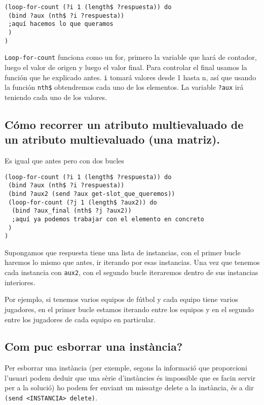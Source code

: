 \documentclass[11pt,svgnames]{scrbook}
\begin{document}
\begin{verbatim}
(loop-for-count (?i 1 (length$ ?respuesta)) do  
 (bind ?aux (nth$ ?i ?respuesta)) 
 ;aquí hacemos lo que queramos 
 ) 
) \end{verbatim} 
 
\texttt{Loop-for-count} funciona como un for, primero la variable que hará
de contador, luego el valor de origen y luego el valor final. Para controlar el
final usamos la función que he explicado antes.
\texttt{i} tomará valores desde 1 hasta n, así que usando la función
\texttt{nth\$} obtendremos cada uno de los elementos. La variable \texttt{?aux} irá
teniendo cada uno de los valores.

\subsection{Cómo recorrer un atributo multievaluado de un atributo multievaluado
(una
matriz).}

Es igual que antes pero con dos bucles


\begin{verbatim}
(loop-for-count (?i 1 (length$ ?respuesta)) do 
 (bind ?aux (nth$ ?i ?respuesta)) 
 (bind ?aux2 (send ?aux get-slot_que_queremos)) 
 (loop-for-count (?j 1 (length$ ?aux2)) do 
  (bind ?aux_final (nth$ ?j ?aux2)) 
  ;aquí ya podemos trabajar con el elemento en concreto
 ) 
) 
\end{verbatim} 

Supongamos que respuesta tiene una lista de instancias, con el primer bucle
haremos lo mismo que antes, ir iterando por esas instancias. Una vez que tenemos
cada instancia con \texttt{aux2}, con el segundo bucle iteraremos dentro de sus
instancias interiores.

Por ejemplo, si tenemos varios equipos de fútbol y cada equipo tiene varios
jugadores, en el primer bucle estamos iterando entre los equipos y en el segundo
entre los jugadores de cada equipo en particular.


\subsection{Com puc esborrar una instància?}


Per esborrar una instància (per exemple, segons la informació que proporcioni
l'usuari podem deduir que una sèrie d'instàncies és impossible que es facin
servir per a la solució) ho podem fer enviant un missatge delete a la instància,
és a dir \texttt{(send <INSTANCIA> delete)}. 
\medskip
\end{document}
